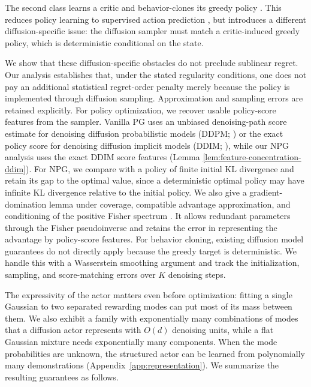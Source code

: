The second class learns a critic and behavior-clones its greedy policy \citep{chi2023diffusionpolicy, yang2023policyrepresentationdiffusionprobability, li2024learningmultimodalbehaviorsscratch}. This reduces policy learning to supervised action prediction \citep{foster2024behaviorcloningneedunderstanding}, but introduces a different diffusion-specific issue: the diffusion sampler must match a critic-induced greedy policy, which is deterministic conditional on the state. 


We show that these diffusion-specific obstacles do not preclude sublinear regret. Our analysis establishes that, under the stated regularity conditions, one does not pay an additional statistical regret-order penalty merely because the policy is implemented through diffusion sampling. Approximation and sampling errors are retained explicitly. For policy
optimization, we recover usable policy-score features from the sampler. Vanilla PG uses an unbiased denoising-path score estimate for denoising diffusion probabilistic models (DDPM; \citealp{ho2020denoising,psenka2024learningdiffusionmodelpolicy}) or the exact policy score for denoising diffusion implicit models (DDIM; \citealp{song2022denoisingdiffusionimplicitmodels}), while our NPG analysis uses the exact DDIM score features (Lemma \ref{lem:feature-concentration-ddim}). For NPG, we compare with a policy of finite initial KL divergence and retain its gap to the optimal value, since a deterministic optimal policy may have infinite KL divergence relative to the initial policy. 
We also give a gradient-domination lemma under coverage, compatible advantage approximation, and conditioning of the positive Fisher spectrum \citep{agarwal2021theory, mei2022globalconvergenceratessoftmax}. It allows redundant parameters through the Fisher pseudoinverse and retains the error in representing the advantage by policy-score features. For behavior cloning, existing diffusion model guarantees do not directly apply because the greedy
target is deterministic. We handle this with a Wasserstein smoothing argument and track the initialization, sampling, and
score-matching errors over $K$ denoising steps.

The expressivity of the actor matters even before optimization: fitting a single Gaussian to two separated rewarding modes can put most of its mass between them. We also exhibit a family with exponentially many combinations of modes that a diffusion actor represents with $O(d)$ denoising units, while a flat Gaussian mixture needs exponentially many components. When the mode probabilities are unknown, the structured actor can be learned from polynomially many demonstrations (Appendix~\ref{app:representation}).
We summarize the resulting guarantees as follows.


